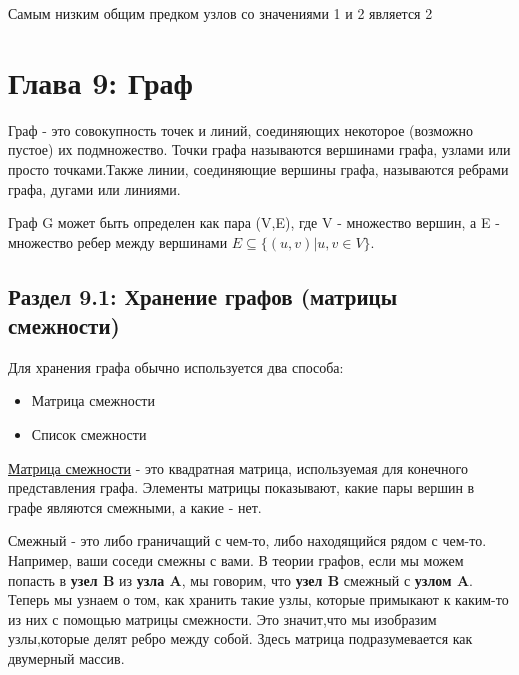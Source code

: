 \vspace{\baselineskip}
Самым низким общим предком   узлов со значениями 1 и 2 является 2

\vspace{\baselineskip}
\chapter*{Глава 9: Граф}
\vspace{-0.5cm}
Граф - это совокупность точек и линий, соединяющих некоторое (возможно пустое) их подмножество. Точки графа называются вершинами графа, узлами или просто точками.Также линии, соединяющие вершины графа, называются ребрами графа, дугами или линиями.

\vspace{\baselineskip}
Граф G может быть определен как пара (V,E), где V - множество вершин, а E - множество ребер между вершинами $E \subseteq \{(u,v) | u,v \in V \}$.

\vspace{-0.2cm}
\section*{Раздел 9.1: Хранение графов (матрицы смежности)}
Для хранения графа обычно используется два способа:

\vspace{-0.2cm}
\begin{itemize}
  \item Матрица смежности
  \vspace{-0.4cm}
  \item Список смежности
\end{itemize}

\vspace{-0.2cm}
\href{https://en.wikipedia.org/wiki/Adjacency_matrix}{\underline{Матрица смежности}} - это квадратная матрица, используемая для конечного представления графа. Элементы матрицы показывают, какие пары вершин в графе являются  смежными, а какие - нет.

\vspace{\baselineskip}
Смежный - это либо граничащий с чем-то, либо находящийся рядом с чем-то. Например, ваши соседи смежны с вами. В теории графов, если мы можем попасть в \textbf{узел B} из \textbf{узла A}, мы говорим, что \textbf{узел B} смежный с \textbf{узлом A}. Теперь мы узнаем о том, как хранить такие узлы, которые примыкают к каким-то  из них с помощью матрицы смежности. Это значит,что мы изобразим узлы,которые делят ребро между собой. Здесь матрица подразумевается как двумерный массив.

